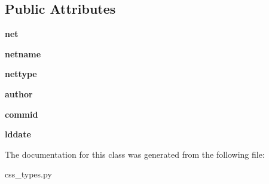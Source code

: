 \subsection*{Public Attributes}
\begin{DoxyCompactItemize}
\item 
\hypertarget{classcss__types_1_1network30_add6c56c42acc8441dbf7c519b84e2971}{}{\bfseries net}\label{classcss__types_1_1network30_add6c56c42acc8441dbf7c519b84e2971}

\item 
\hypertarget{classcss__types_1_1network30_a49ac562eb4a2e4b0e4da833aa3737461}{}{\bfseries netname}\label{classcss__types_1_1network30_a49ac562eb4a2e4b0e4da833aa3737461}

\item 
\hypertarget{classcss__types_1_1network30_a3d41eb15eabe981ddc926f4aa5762fe9}{}{\bfseries nettype}\label{classcss__types_1_1network30_a3d41eb15eabe981ddc926f4aa5762fe9}

\item 
\hypertarget{classcss__types_1_1network30_a5b30ced6316be9769e7ef1de903570c4}{}{\bfseries author}\label{classcss__types_1_1network30_a5b30ced6316be9769e7ef1de903570c4}

\item 
\hypertarget{classcss__types_1_1network30_a6e112eae4ad57e3fc9ac035bd1539119}{}{\bfseries commid}\label{classcss__types_1_1network30_a6e112eae4ad57e3fc9ac035bd1539119}

\item 
\hypertarget{classcss__types_1_1network30_af22e7b2aec1a049dd23e0f6e7d0f3027}{}{\bfseries lddate}\label{classcss__types_1_1network30_af22e7b2aec1a049dd23e0f6e7d0f3027}

\end{DoxyCompactItemize}


The documentation for this class was generated from the following file\+:\begin{DoxyCompactItemize}
\item 
css\+\_\+types.\+py\end{DoxyCompactItemize}
